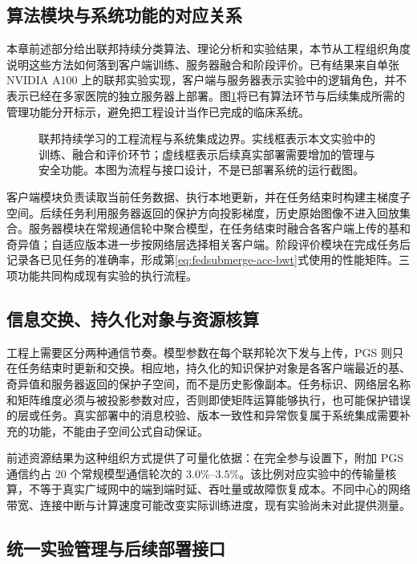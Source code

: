 \subsection{算法模块与系统功能的对应关系}

本章前述部分给出联邦持续分类算法、理论分析和实验结果，本节从工程组织角度说明这些方法如何落到客户端训练、服务器融合和阶段评价。已有结果来自单张 NVIDIA A100 上的联邦实验实现，客户端与服务器表示实验中的逻辑角色，并不表示已经在多家医院的独立服务器上部署。图\ref{fig:fedsubmerge-engineering}将已有算法环节与后续集成所需的管理功能分开标示，避免把工程设计当作已完成的临床系统。

\begin{figure}[htbp]
\centering

\caption[联邦持续学习的工程流程与系统集成边界]{联邦持续学习的工程流程与系统集成边界。实线框表示本文实验中的训练、融合和评价环节；虚线框表示后续真实部署需要增加的管理与安全功能。本图为流程与接口设计，不是已部署系统的运行截图。}
\label{fig:fedsubmerge-engineering}
\end{figure}

客户端模块负责读取当前任务数据、执行本地更新，并在任务结束时构建主梯度子空间。后续任务利用服务器返回的保护方向投影梯度，历史原始图像不进入回放集合。服务器模块在常规通信轮中聚合模型，在任务结束时融合各客户端上传的基和奇异值；自适应版本进一步按网络层选择相关客户端。阶段评价模块在完成任务后记录各已见任务的准确率，形成第\ref{eq:fedsubmerge-acc-bwt}式使用的性能矩阵。三项功能共同构成现有实验的执行流程。

\subsection{信息交换、持久化对象与资源核算}

工程上需要区分两种通信节奏。模型参数在每个联邦轮次下发与上传，PGS 则只在任务结束时更新和交换。相应地，持久化的知识保护对象是各客户端最近的基、奇异值和服务器返回的保护子空间，而不是历史影像副本。任务标识、网络层名称和矩阵维度必须与被投影参数对应，否则即使矩阵运算能够执行，也可能保护错误的层或任务。真实部署中的消息校验、版本一致性和异常恢复属于系统集成需要补充的功能，不能由子空间公式自动保证。

前述资源结果为这种组织方式提供了可量化依据：在完全参与设置下，附加 PGS 通信约占 20 个常规模型通信轮次的 $3.0\%$--$3.5\%$。该比例对应实验中的传输量核算，不等于真实广域网中的端到端时延、吞吐量或故障恢复成本。不同中心的网络带宽、连接中断与计算速度可能改变实际训练进度，现有实验尚未对此提供测量。

\subsection{统一实验管理与后续部署接口}

